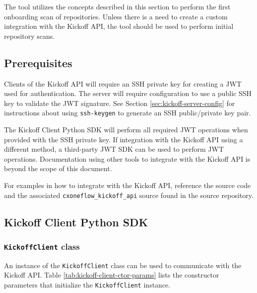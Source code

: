 The \cxoneflowaudit tool utilizes the concepts described in this section to perform the
first onboarding scan of repositories. Unless there is a need to create a custom integration
with the \cxoneflow Kickoff API, the \cxoneflowaudit tool should be used to perform initial repository scans.

\subsection{Prerequisites}

Clients of the Kickoff API will require an SSH private key for creating a JWT used for authentication.
The \cxoneflow server will require configuration to use a public SSH key to validate the JWT signature.
See Section \ref{sec:kickoff-server-config} for instructions about using \texttt{ssh-keygen} to generate
an SSH public/private key pair.

The Kickoff Client Python SDK will perform all required JWT operations when provided with the SSH
private key.  If integration with the Kickoff API using a different method, a third-party JWT
SDK can be used to perform JWT operations.  Documentation using other tools to integrate with
the Kickoff API is beyond the scope of this document.

For examples in how to integrate with the Kickoff API, reference the \cxoneflowaudit source code
and the associated \texttt{cxoneflow\_kickoff\_api} source found in the \cxoneflow source repository.

\subsection{Kickoff Client Python SDK}\label{sec:kickoff-sdk}

\subsubsection{\texttt{KickoffClient} class}

An instance of the \texttt{KickoffClient} class can be used to communicate with
the \cxoneflow Kickoff API.  Table \ref{tab:kickoff-client-ctor-params} lists the
constructor parameters that initialize the \texttt{KickoffClient} instance.

